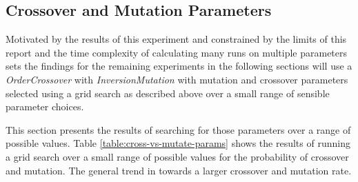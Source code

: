 \documentclass[journal]{IEEEtran}
\begin{document}
\subsection{Crossover and Mutation Parameters}
\label{subsec:crossover-mutation-parameters}
Motivated by the results of this experiment and constrained by the limits of this report and the time complexity of calculating many runs on multiple parameters sets the findings for the remaining experiments in the following sections will use a \textit{OrderCrossover} with \textit{InversionMutation} with mutation and crossover parameters selected using a grid search as described above over a small range of sensible parameter choices.

This section presents the results of searching for those parameters over a range of possible values. Table \ref{table:cross-vs-mutate-params} shows the results of running a grid search over a small range of possible values for the probability of crossover and mutation. The general trend in towards a larger crossover and mutation rate.

\begin{table}[t]
\centering

\caption{Median fitness of running each of the different types parameter values for population size and tournament size with \textit{TournamentSelection}. For all tests \textit{OrderCrossover} and \textit{InversionMutation} are used. All runs used a $0.9$ crossover rate and a $0.2$ mutation rate based on the results in section \ref{subsec:crossover-mutation-parameters}. Each was run for a total of $1000$ generations.}
\label{table:selection-vs-pop-size}
\end{table}

\begin{table}[t]
\centering

\caption{Median fitness of running each of the different population sizes with \textit{RouletteWheelSelection}. For all tests \textit{OrderCrossover} and \textit{InversionMutation} are used. All runs used a $0.9$ crossover rate and a $0.2$ mutation rate based on the results in section \ref{subsec:crossover-mutation-parameters}. Each was run for a total of $1000$ generations. No results successfully converged}
\label{table:selection-vs-pop-size2}
\end{table}
\end{document}
